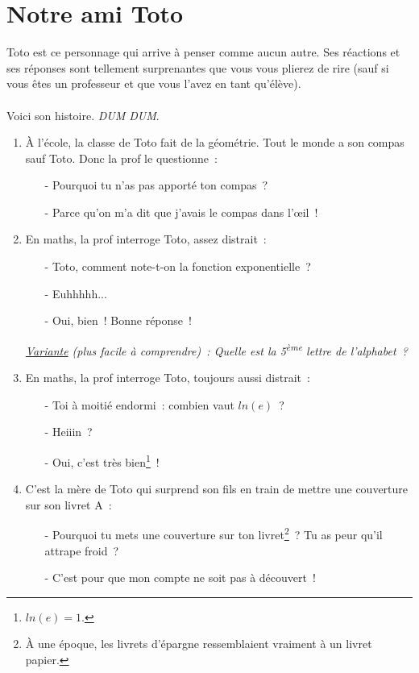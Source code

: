 \documentclass[10pt,a5paper,fullpage]{book}
\begin{document}
	\chapter{Notre ami Toto}
	Toto est ce personnage qui arrive à penser comme aucun autre. Ses réactions et ses réponses sont tellement surprenantes que vous vous plierez de rire (sauf si vous êtes un professeur et que vous l'avez en tant qu'élève). \\ \\
	Voici son histoire. \textit{DUM DUM}. 
	\newpage
	\begin{enumerate}
		\item À l’école, la classe de Toto fait de la géométrie. Tout le monde a son compas sauf Toto. Donc la prof le questionne~:
		\begin{itemize}
			\item[-] Pourquoi tu n’as pas apporté ton compas~?
			\item[-] Parce qu’on m’a dit que j’avais le compas dans l’œil~! 
		\end{itemize}
		
		\item En maths, la prof interroge Toto, assez distrait~: 
		\begin{itemize}
			\item[-] Toto, comment note-t-on la fonction exponentielle~?
			\item[-] Euhhhhh...
			\item[-] Oui, bien~! Bonne réponse~!
		\end{itemize}
		\textit{\underline{Variante} (plus facile à comprendre)~: Quelle est la 5\textsuperscript{ème} lettre de l’alphabet~?}
		
		\item En maths, la prof interroge Toto, toujours aussi distrait~:
		\begin{itemize}
			\item[-] Toi à moitié endormi~: combien vaut $ln(e)$~?
			\item[-] Heiiin~?
			\item[-] Oui, c’est très bien\footnote{$ln(e) = 1$.}~!
		\end{itemize}
		
		\item C’est la mère de Toto qui surprend son fils en train de mettre une couverture sur son livret A~:
		\begin{itemize}
			\item[-] Pourquoi tu mets une couverture sur ton livret\footnote{À une époque, les livrets d'épargne ressemblaient vraiment à un livret papier.}~? Tu as peur qu'il attrape froid~?
			\item[-] C’est pour que mon compte ne soit pas à découvert~!
		\end{itemize}
		

\end{enumerate}
\end{document}
